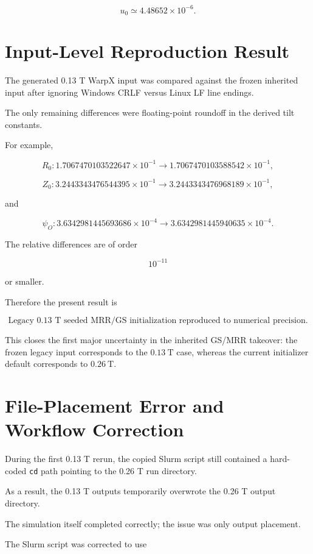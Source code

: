 \documentclass[11pt,a4paper]{article}
\begin{document}
\[
u_0\simeq4.48652\times10^{-6}.
\]

\section{Input-Level Reproduction Result}

The generated 0.13 T WarpX input was compared against the frozen inherited
input after ignoring Windows CRLF versus Linux LF line endings.

The only remaining differences were floating-point roundoff in the derived
tilt constants.

For example,

\[
R_0:
1.7067470103522647\times10^{-1}
\rightarrow
1.7067470103588542\times10^{-1},
\]

\[
Z_0:
3.2443343476544395\times10^{-1}
\rightarrow
3.2443343476968189\times10^{-1},
\]

and

\[
\psi_O:
3.6342981445693686\times10^{-4}
\rightarrow
3.6342981445940635\times10^{-4}.
\]

The relative differences are of order

\[
10^{-11}
\]

or smaller.

Therefore the present result is

\[
\boxed{
\text{Legacy 0.13 T seeded MRR/GS initialization reproduced to numerical precision.}
}
\]

This closes the first major uncertainty in the inherited GS/MRR takeover:
the frozen legacy input corresponds to the \(0.13~\mathrm{T}\) case, whereas
the current initializer default corresponds to \(0.26~\mathrm{T}\).

\section{File-Placement Error and Workflow Correction}

During the first 0.13 T rerun, the copied Slurm script still contained a
hard-coded \texttt{cd} path pointing to the 0.26 T run directory.

As a result, the 0.13 T outputs temporarily overwrote the 0.26 T output
directory.

The simulation itself completed correctly; the issue was only output
placement.

The Slurm script was corrected to use
\end{document}
